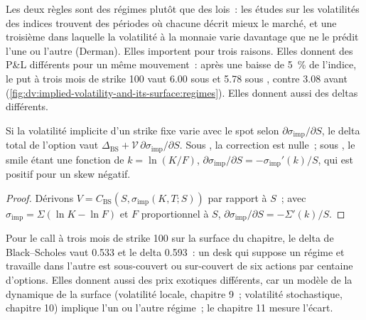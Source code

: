 Les deux règles sont des régimes plutôt que des lois~: les études sur les volatilités des indices trouvent des périodes
où chacune décrit mieux le marché, et une troisième dans laquelle la volatilité à la monnaie varie davantage
que ne le prédit l'une ou l'autre (Derman). Elles importent pour trois raisons.
Elles donnent des P\&L différents pour un même mouvement~: après une baisse de 5~\% de l'indice, le
put à trois mois de strike 100 vaut 6.00 sous  et 5.78 sous , contre 3.08 avant (\cref{fig:dv:implied-volatility-and-its-surface:regimes}).
Elles donnent aussi des deltas différents.

\begin{proposition}\label{prop:dv:implied-volatility-and-its-surface:delta}
Si la volatilité implicite d'un strike fixe varie avec le spot selon $\partial\sigma_{\mathrm{imp}}/\partial S$,
le delta total de l'option vaut $\Delta_{\mathrm{BS}}+\mathcal V\,\partial\sigma_{\mathrm{imp}}/\partial S$.
Sous , la correction est nulle~; sous , le smile étant une fonction
de $k=\ln(K/F)$, $\partial\sigma_{\mathrm{imp}}/\partial S=-\sigma_{\mathrm{imp}}'(k)/S$, qui est
positif pour un skew négatif.
\end{proposition}
\begin{proof}
Dérivons $V=C_{\mathrm{BS}}(S,\sigma_{\mathrm{imp}}(K,T;S))$ par rapport à $S$~; avec
$\sigma_{\mathrm{imp}}=\Sigma(\ln K-\ln F)$ et $F$ proportionnel à $S$,
$\partial\sigma_{\mathrm{imp}}/\partial S=-\Sigma'(k)/S$.
\end{proof}

Pour le call à trois mois de strike 100 sur la surface du chapitre, le delta de Black--Scholes
vaut 0.533 et le delta  0.593~: un desk qui suppose un régime et travaille dans l'autre
est sous-couvert ou sur-couvert de six actions par centaine d'options. Elles donnent aussi des
prix exotiques différents, car un modèle de la dynamique de la surface (volatilité locale, chapitre 9~;
volatilité stochastique, chapitre 10) implique l'un ou l'autre régime~; le chapitre 11 mesure
l'écart.


